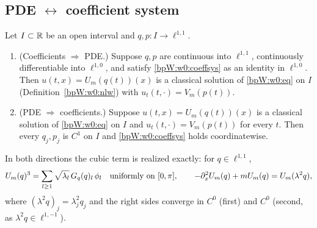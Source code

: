 \subsection{PDE \texorpdfstring{$\leftrightarrow$}{<->} coefficient system}\label{bpW:w0n:pde}

\begin{proposition}[Equivalence, (a)]\label{bpW:w0n:pde-equiv}
Let $I\subset\mathbb{R}$ be an open interval and $q,p:I\to\ell^{1,1}$.
\begin{enumerate}[label=(\roman*)]
\item (Coefficients $\Rightarrow$ PDE.) Suppose $q,p$ are continuous into $\ell^{1,1}$, continuously differentiable
  into $\ell^{1,0}$, and satisfy \eqref{bpW:w0:coeffsys} as an identity in $\ell^{1,0}$. Then
  $u(t,x)=U_m(q(t))(x)$ is a classical solution of \eqref{bpW:w0:eq} on $I$ (Definition~\ref{bpW:w0:nlw}) with
  $u_t(t,\cdot)=V_m(p(t))$.
\item (PDE $\Rightarrow$ coefficients.) Suppose $u(t,x)=U_m(q(t))(x)$ is a classical solution of
  \eqref{bpW:w0:eq} on $I$ and $u_t(t,\cdot)=V_m(p(t))$ for every $t$. Then every $q_j,p_j$ is $C^1$ on $I$ and
  \eqref{bpW:w0:coeffsys} holds coordinatewise.
\end{enumerate}
In both directions the cubic term is realized exactly: for $q\in\ell^{1,1}$,
\begin{equation}\label{bpW:w0n:force}
U_m(q)^3=\sum_{l\ge1}\sqrt{\lambda_l}\,G_q(q)_l\,\phi_l\quad\text{uniformly on }[0,\pi],\qquad
-\partial_x^2U_m(q)+mU_m(q)=U_m(\lambda^2q),
\end{equation}
where $(\lambda^2q)_j=\lambda_j^2q_j$ and the right sides converge in $C^0$ (first) and $C^0$ (second, as
$\lambda^2q\in\ell^{1,-1}$).
\end{proposition}

